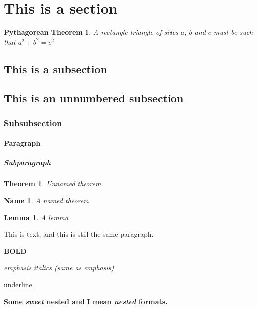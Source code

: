 \documentclass{article}
\title{}
\author{Miguel Murça}
\date{November 10, 2016}
\newtheorem{theorem0}{Pythagorean Theorem}
\newtheorem{theorem1}{Theorem}
\newtheorem{theorem2}{Name}
\newtheorem{theorem3}{Lemma}
\begin{document}
\maketitle

\section{This is a section}

\begin{theorem0}
    A rectangle triangle of sides $a$, $b$ and $c$ must be
    such that
    $a^2 + b^2 = c^2$
\end{theorem0}

\subsection{This is a subsection}

\subsection*{This is an unnumbered subsection}

\subsubsection{Subsubsection}

\paragraph{Paragraph}

\subparagraph{Subparagraph}

\begin{theorem1}
    Unnamed theorem.
\end{theorem1}

\begin{theorem2}
    A named theorem
\end{theorem2}

\begin{theorem3}
    A lemma
\end{theorem3}

This is text,
and this is still the same paragraph.

\textbf{BOLD}

\emph{emphasis}
\emph{italics (same as emphasis)}

\underline{underline}

\textbf{Some \emph{sweet} \underline{nested} and I mean \underline{\emph{nested}} formats.}
\end{document}

